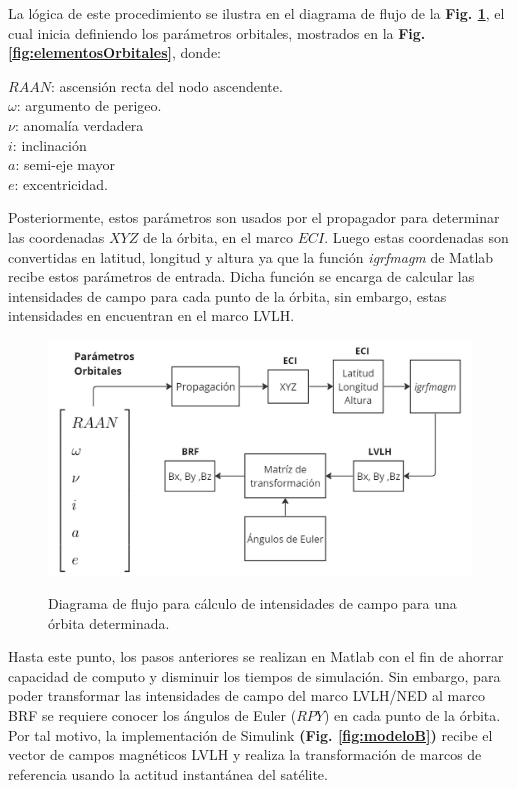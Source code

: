 La lógica de este procedimiento se ilustra en el diagrama de flujo de la \textbf{Fig. \ref{fig:flujoCampo}}, el cual inicia definiendo los parámetros orbitales, mostrados en la \textbf{Fig. \ref{fig:elementosOrbitales}}, donde:

\noindent$RAAN$: ascensión recta del nodo ascendente.  \\
$\omega$: argumento de perigeo. \\
$\nu$: anomalía verdadera\\
$i$: inclinación \\
$a$: semi-eje mayor \\
$e$: excentricidad.
	 
Posteriormente, estos parámetros son usados por el propagador para determinar las coordenadas $XYZ$ de la órbita, en el marco $ECI$. Luego estas coordenadas son convertidas en latitud, longitud y altura ya que la función \textit{igrfmagm} de Matlab recibe estos parámetros de entrada. Dicha función se encarga de calcular las intensidades de campo para cada punto de la órbita, sin embargo, estas intensidades en encuentran en el marco LVLH.
\begin{figure}[!ht]
	\begin{center}
		\includegraphics[scale=0.4]{imagenes/modelo_dinamico/flujo_campo.png}\\
	\end{center}
	\caption{Diagrama de flujo para cálculo de intensidades de campo para una órbita determinada.}
	\label{fig:flujoCampo}
	\textit{}
\end{figure}
Hasta este punto, los pasos anteriores se realizan en Matlab con el fin de ahorrar capacidad de computo y disminuir los tiempos de simulación. Sin embargo, para poder transformar las intensidades de campo del marco LVLH/NED al marco BRF se requiere conocer los ángulos de Euler ($RPY$) en cada punto de la órbita. Por tal motivo, la implementación de Simulink  \textbf{(Fig. \ref{fig:modeloB})}  recibe el vector de campos magnéticos LVLH y realiza la transformación de marcos de referencia usando la actitud instantánea del satélite.

